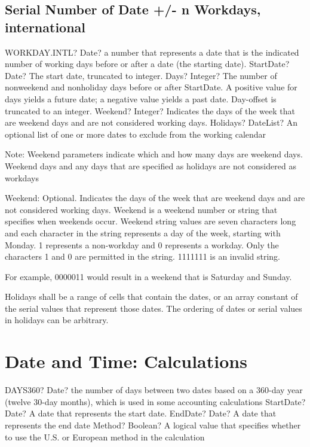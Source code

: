 \subsection{Serial Number of Date +/- n Workdays, international}

\begin{mpFunctionsExtract}
	\mpWorksheetFunctionFourNotImplemented
	{WORKDAY.INTL? Date? a number that represents a date that is the indicated number of working days before or after a date (the starting date).}
	{StartDate? Date? The start date, truncated to integer.}
	{Days? Integer? The number of nonweekend and nonholiday days before or after StartDate. A positive value for days yields a future date; a negative value yields a past date.  Day-offset is truncated to an integer.}
	{Weekend? Integer? Indicates the days of the week that are weekend days and are not considered working days.}
	{Holidays? DateList?  An optional list of one or more dates to exclude from the working calendar}
\end{mpFunctionsExtract}

\vspace{0.3cm}
Note: Weekend parameters indicate which and how many days are weekend days. Weekend days and any days that are specified as holidays are not considered as workdays

Weekend:  Optional. Indicates the days of the week that are weekend days and are not considered working days. Weekend is a weekend number or string that specifies when weekends occur.
Weekend string values are seven characters long and each character in the string represents a day of the week, starting with Monday. 1 represents a non-workday and 0 represents a workday. Only the characters 1 and 0 are permitted in the string. 1111111 is an invalid string.

For example, 0000011 would result in a weekend that is Saturday and Sunday.

Holidays shall be a range of cells that contain the dates, or an array constant of the serial values that represent those dates. The ordering of dates or serial values in holidays can be arbitrary.





\newpage
\section{Date and Time: Calculations}

\begin{mpFunctionsExtract}
	\mpWorksheetFunctionThreeNotImplemented
	{DAYS360? Date? the number of days between two dates based on a 360-day year (twelve 30-day months), which is used in some accounting calculations}
	{StartDate? Date? A date that represents the start date.}
	{EndDate? Date? A date that represents the end date}
	{Method? Boolean?  A logical value that specifies whether to use the U.S. or European method in the calculation}
\end{mpFunctionsExtract}

